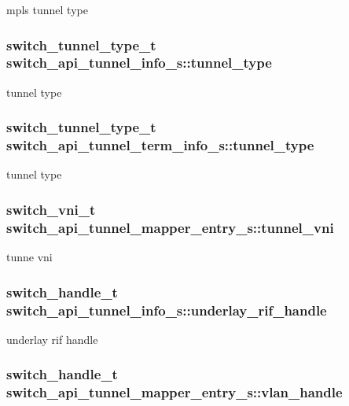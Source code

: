 mpls tunnel type \hypertarget{group__Tunnel_ga6685d34b1ba33c1f547b06b6a9237a62}{
\subsubsection[{tunnel\+\_\+type}]{\setlength{\rightskip}{0pt plus 5cm}switch\+\_\+tunnel\+\_\+type\+\_\+t switch\+\_\+api\+\_\+tunnel\+\_\+info\+\_\+s\+::tunnel\+\_\+type}}\label{group__Tunnel_ga6685d34b1ba33c1f547b06b6a9237a62}
tunnel type \hypertarget{group__Tunnel_gaa35e1acc0835967b9202df9383e8a060}{
\subsubsection[{tunnel\+\_\+type}]{\setlength{\rightskip}{0pt plus 5cm}switch\+\_\+tunnel\+\_\+type\+\_\+t switch\+\_\+api\+\_\+tunnel\+\_\+term\+\_\+info\+\_\+s\+::tunnel\+\_\+type}}\label{group__Tunnel_gaa35e1acc0835967b9202df9383e8a060}
tunnel type \hypertarget{group__Tunnel_ga6df67b78ae859af0bd8c54bffe5a25a6}{
\subsubsection[{tunnel\+\_\+vni}]{\setlength{\rightskip}{0pt plus 5cm}switch\+\_\+vni\+\_\+t switch\+\_\+api\+\_\+tunnel\+\_\+mapper\+\_\+entry\+\_\+s\+::tunnel\+\_\+vni}}\label{group__Tunnel_ga6df67b78ae859af0bd8c54bffe5a25a6}
tunne vni \hypertarget{group__Tunnel_ga37daad6891f426ccac9ea1c7f750a443}{
\subsubsection[{underlay\+\_\+rif\+\_\+handle}]{\setlength{\rightskip}{0pt plus 5cm}switch\+\_\+handle\+\_\+t switch\+\_\+api\+\_\+tunnel\+\_\+info\+\_\+s\+::underlay\+\_\+rif\+\_\+handle}}\label{group__Tunnel_ga37daad6891f426ccac9ea1c7f750a443}
underlay rif handle \hypertarget{group__Tunnel_ga15e98ca4e3a4039ada5611919b7b6a53}{
\subsubsection[{vlan\+\_\+handle}]{\setlength{\rightskip}{0pt plus 5cm}switch\+\_\+handle\+\_\+t switch\+\_\+api\+\_\+tunnel\+\_\+mapper\+\_\+entry\+\_\+s\+::vlan\+\_\+handle}}\label{group__Tunnel_ga15e98ca4e3a4039ada5611919b7b6a53}
